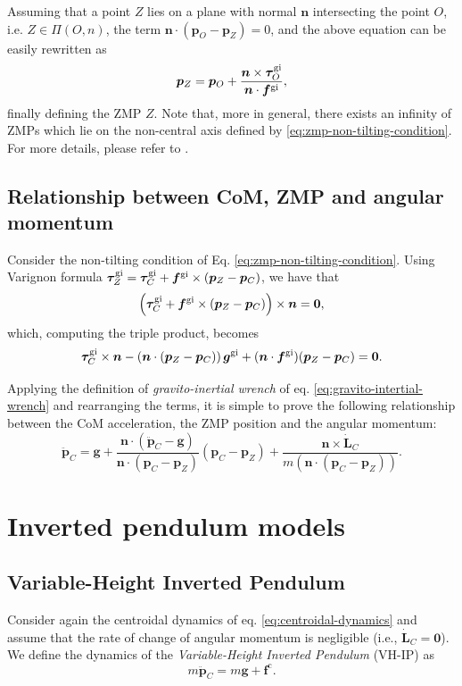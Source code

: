 Assuming that a point $Z$ lies on a plane with normal $\bm{n}$ intersecting the point $O$, i.e. $Z \in \Pi(O, n)$, the term $\bm{n} \cdot (\bm{p}_O - \bm{p}_Z) = 0$, and the above equation can be easily rewritten as
\begin{equation}
    \bm{p}_Z = \bm{p}_O + \frac{\bm{n} \times \bm{\tau}_O^{\rm gi}}{\bm{n} \cdot \bm{f}^{\rm gi}},
\end{equation}
finally defining the ZMP $Z$. Note that, more in general, there exists an infinity of ZMPs which lie on the non-central axis defined by \eqref{eq:zmp-non-tilting-condition}. For more details, please refer to \cite{SardainBessonnet2004}.

\subsection{Relationship between CoM, ZMP and angular momentum}
Consider the non-tilting condition of Eq. \eqref{eq:zmp-non-tilting-condition}. Using Varignon formula $\bm{\tau}_Z^{\rm gi} = \bm{\tau}_C^{\rm gi} + \bm{f}^{\rm gi} \times (\bm{p}_Z - \bm{p}_C)$, we have that
\begin{equation}
    \left(\bm{\tau}_C^{\rm gi} + \bm{f}^{\rm gi} \times (\bm{p}_Z - \bm{p}_C)\right) \times \bm{n} = \bm{0},
\end{equation}
which, computing the triple product, becomes
\begin{equation}
    \bm{\tau}_C^{\rm gi} \times \bm{n} - \left(\bm{n} \cdot (\bm{p}_Z - \bm{p}_C)\right) \bm{g}^{\rm gi} + (\bm{n} \cdot \bm{f}^{\rm gi}) (\bm{p}_Z - \bm{p}_C) = \bm{0}.
\end{equation}

Applying the definition of \textit{gravito-inertial wrench} of eq. \eqref{eq:gravito-intertial-wrench} and rearranging the terms, it is simple to prove \cite{Caron2017TRO} the following relationship between the CoM acceleration, the ZMP position and the angular momentum:
\begin{equation}
    \label{eq:relationship-com-zmp-angular-momentum}
    \ddot{\bm{p}}_C = \bm{g} + \frac{\bm{n} \cdot (\bm{\ddot{p}}_C - \bm{g})}{\bm{n} \cdot (\bm{p}_C - \bm{p}_Z)} (\bm{p}_C - \bm{p}_Z) + \frac{\bm{n} \times \bm{\dot{L}}_C}{m \left(\bm{n} \cdot (\bm{p}_C - \bm{p}_Z)\right)}.
\end{equation}
\section{Inverted pendulum models}
\subsection{Variable-Height Inverted Pendulum}
Consider again the centroidal dynamics of eq. \eqref{eq:centroidal-dynamics}
and assume that the rate of change of angular momentum is negligible (i.e.,
$\dot{\bm{L}}_C=\bm{0}$). We define the dynamics of the \textit{Variable-Height
Inverted Pendulum} (VH-IP) \cite{Koolen2016VHIP} as
\begin{equation}
    \label{eq:VH-IP}
    m \ddot{\bm{p}}_C = m \bm{g} + \bm{f}^{\mathrm{c}}.
\end{equation}

